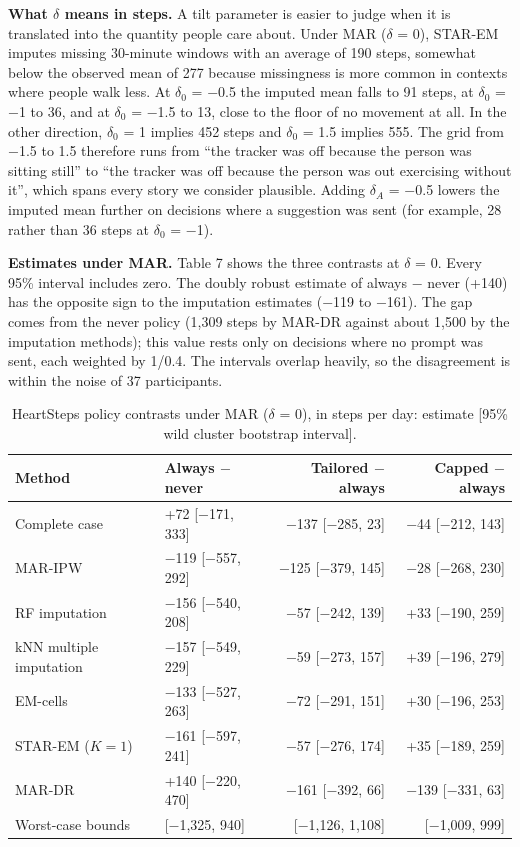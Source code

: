 \documentclass[12pt]{article}
\begin{document}
\textbf{What $\delta$ means in steps.} A tilt parameter is easier to judge when it is translated into the quantity people care about. Under MAR ($\delta$ = 0), STAR-EM imputes missing 30-minute windows with an average of 190 steps, somewhat below the observed mean of 277 because missingness is more common in contexts where people walk less. At $\delta_0$ = $-$0.5 the imputed mean falls to 91 steps, at $\delta_0$ = $-$1 to 36, and at $\delta_0$ = $-$1.5 to 13, close to the floor of no movement at all. In the other direction, $\delta_0$ = 1 implies 452 steps and $\delta_0$ = 1.5 implies 555. The grid from $-$1.5 to 1.5 therefore runs from ``the tracker was off because the person was sitting still'' to ``the tracker was off because the person was out exercising without it'', which spans every story we consider plausible. Adding $\delta_A$ = $-$0.5 lowers the imputed mean further on decisions where a suggestion was sent (for example, 28 rather than 36 steps at $\delta_0$ = $-$1).

\textbf{Estimates under MAR.} Table 7 shows the three contrasts at $\delta$ = 0. Every 95\% interval includes zero. The doubly robust estimate of always $-$ never (+140) has the opposite sign to the imputation estimates ($-$119 to $-$161). The gap comes from the never policy (1,309 steps by MAR-DR against about 1,500 by the imputation methods); this value rests only on decisions where no prompt was sent, each weighted by 1/0.4. The intervals overlap heavily, so the disagreement is within the noise of 37 participants.

\begin{table}[!htbp]\centering\small
\caption{HeartSteps policy contrasts under MAR ($\delta$ = 0), in steps per day: estimate [95\% wild cluster bootstrap interval].}
\begin{tabular}{llrr}
\toprule
\textbf{Method} & \textbf{Always $-$ never} & \textbf{Tailored $-$ always} & \textbf{Capped $-$ always} \\
\midrule
Complete case & +72 [$-$171, 333] & $-$137 [$-$285, 23] & $-$44 [$-$212, 143] \\
MAR-IPW & $-$119 [$-$557, 292] & $-$125 [$-$379, 145] & $-$28 [$-$268, 230] \\
RF imputation & $-$156 [$-$540, 208] & $-$57 [$-$242, 139] & +33 [$-$190, 259] \\
kNN multiple imputation & $-$157 [$-$549, 229] & $-$59 [$-$273, 157] & +39 [$-$196, 279] \\
EM-cells & $-$133 [$-$527, 263] & $-$72 [$-$291, 151] & +30 [$-$196, 253] \\
STAR-EM ($K=1$) & $-$161 [$-$597, 241] & $-$57 [$-$276, 174] & +35 [$-$189, 259] \\
MAR-DR & +140 [$-$220, 470] & $-$161 [$-$392, 66] & $-$139 [$-$331, 63] \\
Worst-case bounds & [$-$1,325, 940] & [$-$1,126, 1,108] & [$-$1,009, 999] \\
\bottomrule
\end{tabular}
\end{table}
\end{document}
